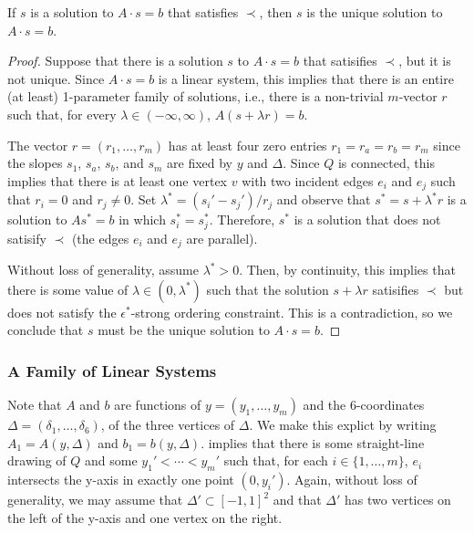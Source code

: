 \documentclass{patmorin}
\begin{document}
\begin{lem}
   If $s$ is a solution to $A\cdot s=b$ that satisfies $\prec$, then $s$ is 
   the unique solution to $A\cdot s=b$.
\end{lem}

\begin{proof}
   Suppose that there is a solution $s$ to $A\cdot s=b$ that satisifies $\prec$,
   but it is not unique.  Since $A\cdot s=b$ is a linear system, this implies
   that there is an entire (at least) 1-parameter family of solutions,
   i.e., there is a non-trivial $m$-vector $r$ such that, for every
   $\lambda\in(-\infty,\infty)$, $A(s+\lambda r)=b$.

   The vector $r=(r_1,\ldots,r_m)$ has at least four zero entries
   $r_1=r_a=r_b=r_m$ since the slopes $s_1$, $s_a$, $s_b$, and $s_m$
   are fixed by $y$ and $\Delta$.  Since $Q$ is connected, this implies
   that there is at least one vertex $v$ with two incident edges $e_i$
   and $e_j$ such that $r_i=0$ and $r_j\neq 0$.  Set $\lambda^* =
   (s_i'-s_j')/r_j$ and observe that $s^*=s+\lambda^* r$ is a solution
   to $As^*=b$ in which $s_i^*=s_j^*$.  Therefore, $s^*$ is a solution that
   does not satisify $\prec$ (the edges $e_i$ and $e_j$
   are parallel).  

   Without loss of generality, assume $\lambda^* >0$. Then, by continuity,
   this implies that there is some value of $\lambda\in (0,\lambda^*)$
   such that the solution $s+\lambda r$ satisifies $\prec$ but does
   not satisfy the $\epsilon^*$-strong ordering constraint.  This is a
   contradiction, so we conclude that $s$ must be the unique solution
   to $A\cdot s=b$.
\end{proof}

\subsubsection{A Family of Linear Systems}

   Note that $A$ and $b$ are functions of $y=(y_1,\ldots,y_m)$
   and the 6-coordinates $\Delta=(\delta_1,\ldots,\delta_6)$, of
   the three vertices of $\Delta$.  We make this explict by writing
   $A_1=A(y,\Delta)$ and $b_1=b(y,\Delta)$.  
   implies that there is some straight-line drawing of $Q$ and some
   $y_1'<\cdots< y_m'$ such that, for each $i\in\{1,\ldots,m\}$, $e_i$
   intersects the y-axis in exactly one point $(0,y_i')$.  Again, without loss
   of generality, we may assume that $\Delta'\subset [-1,1]^2$ and that
   $\Delta'$ has two vertices on the left of the y-axis and one vertex
   on the right.
\end{document}
